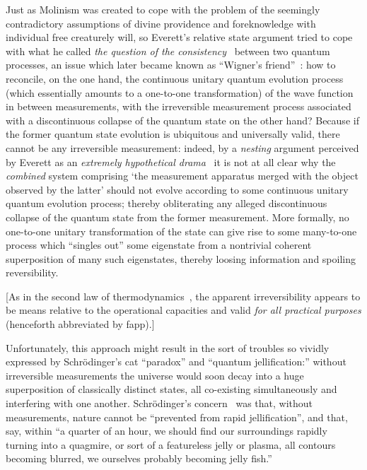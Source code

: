 \documentclass[%
  twocolumn,
 showpacs,
 showkeys,
 preprintnumbers,
 amsmath,amssymb,
 aps,
  pra,
  longbibliography,
 ]{revtex4-1}
\begin{document}
Just as Molinism was created to cope with the problem of the seemingly contradictory assumptions of
divine providence and foreknowledge with individual free creaturely
will, so Everett's relative state argument tried
to cope with what he called {\em the question of the consistency}~\cite[p.~73]{everett-1956}
between two quantum processes, an issue which later became known as ``Wigner's friend''~\cite{wigner:mb}:
how to reconcile,
on the one hand, the continuous unitary quantum evolution process (which essentially amounts to a one-to-one transformation)
of the wave function in between measurements,
with the irreversible measurement process associated with a discontinuous collapse of the quantum state on the other hand?
Because if the former quantum state evolution is ubiquitous and universally valid,
there cannot be any irreversible measurement:
indeed, by a {\em nesting} argument perceived by Everett as an {\em extremely hypothetical drama}~\cite[pp.~74-75]{everett-1956}  it is not at all clear why the
{\em combined} system  comprising `the measurement apparatus merged  with the object observed by the latter'
should not evolve according to some continuous unitary quantum evolution process;
thereby obliterating any alleged discontinuous collapse of the quantum state from the former measurement.
More formally, no
one-to-one unitary transformation of the state  can give rise to some many-to-one process
which ``singles out'' some eigenstate from a nontrivial coherent superposition of many such eigenstates,
thereby loosing information and spoiling reversibility.

[As in the second law of thermodynamics~\cite{Myrvold2011237}, the apparent irreversibility appears to be
means relative to the operational capacities
and valid {\em for all practical purposes} (henceforth abbreviated by fapp).]



Unfortunately, this approach might result in the sort of troubles so vividly expressed by Schr\"odinger's cat ``paradox''
and ``quantum jellification:'' without irreversible measurements the universe would soon decay into a huge
superposition of classically distinct states,
all co-existing simultaneously and interfering with one another.
Schr\"odinger's concern~\cite[p.~19]{schroedinger-interpretation} was that, without measurements,
nature cannot be {``prevented from rapid jellification''}, and that, say, within
{``a quarter of an hour, we should find our surroundings rapidly
turning into a quagmire, or sort of a featureless jelly or plasma, all contours
becoming blurred, we ourselves probably becoming jelly fish.''}
\end{document}
